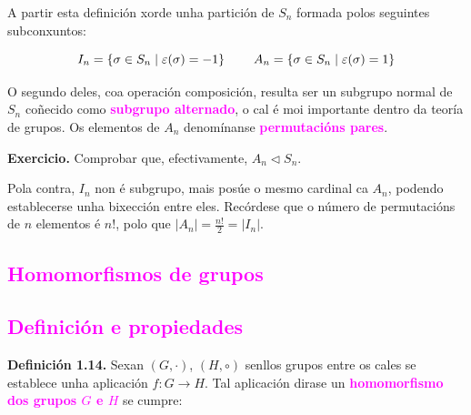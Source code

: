 \documentclass[twoside]{report}
\theoremstyle{mystyle}
\begin{document}
\vspace{3mm}

\noindent A partir esta definición xorde unha partición de $S_{n}$ formada polos seguintes subconxuntos:

$$I_{n} = \{ \sigma \in S_{n} \hspace{1mm} | \hspace{1mm} \varepsilon(\sigma) = -1 \}
\hspace{8Mm}
A_{n} = \{ \sigma \in S_{n} \hspace{1mm} | \hspace{1mm} \varepsilon(\sigma) = 1 \}$$

\vspace{2mm}

\noindent O segundo deles, coa operación composición, resulta ser un subgrupo normal de $S_{n}$ coñecido como \textcolor{magenta}{\textbf{subgrupo alternado}}, o cal é moi importante dentro da teoría de grupos. Os elementos de $A_{n}$ denomínanse \textcolor{magenta}{\textbf{permutacións pares}}. \\

\vspace{2mm}

\noindent \textbf{Exercicio.} Comprobar que, efectivamente, $A_{n} \triangleleft S_{n}$.\\

\vspace{2mm}

\noindent Pola contra, $I_{n}$ non é subgrupo, mais posúe o mesmo cardinal ca $A_{n}$, podendo establecerse unha bixección entre eles. Recórdese que o número de permutacións de $n$ elementos é $n!$, polo que $|A_{n}| = \displaystyle \frac{n!}{2} = |I_{n}|$.

\textcolor{magenta}{\section{Homomorfismos de grupos}}

\textcolor{magenta}{\subsection{Definición e propiedades}}

\hspace{5mm}

\noindent \textbf{Definición 1.14.} Sexan $(G, \cdot)$, $(H, \circ)$ senllos grupos entre os cales se establece unha aplicación $f: G \longrightarrow H$. Tal aplicación dirase un \textcolor{magenta}{\textbf{homomorfismo dos grupos $G$ e $H$}} se cumpre: \\
\end{document}
